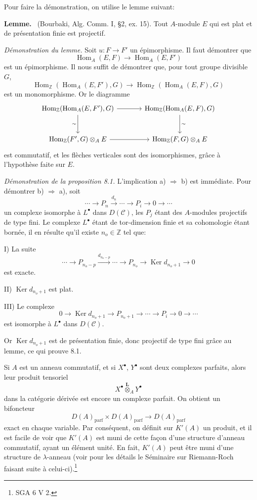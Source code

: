 \documentclass[11pt]{article}
\newenvironment{statement}[1]{\par\medskip\noindent\textbf{#1.}\ }{\par\medskip}
\DeclareMathOperator{\Hom}{Hom}
\providecommand{\Ker}{\operatorname{Ker}}
\providecommand{\parf}{\mathrm{parf}}
\providecommand{\Hom}{\operatorname{Hom}}
\providecommand{\cC}{\mathcal C}
\providecommand{\Ker}{\operatorname{Ker}}
\providecommand{\Ker}{\operatorname{Ker}}
\providecommand{\cC}{\mathcal C}
\providecommand{\parf}{\mathrm{parf}}
\begin{document}
Pour faire la démonstration, on utilise le lemme suivant:

\begin{statement}{Lemme}
(Bourbaki, Alg. Comm. I, §2, ex. 15). Tout $A$-module $E$ qui est plat et de présentation finie est projectif.
\end{statement}

\emph{Démonstration du lemme.} Soit $u:F\to F'$ un épimorphisme. Il faut démontrer que
\[
\Hom_A(E,F)\longrightarrow\Hom_A(E,F')
\]
est un épimorphisme. Il nous suffit de démontrer que, pour tout groupe divisible $G$,
\[
\Hom_{\mathbb Z}(\Hom_A(E,F'),G)\longrightarrow
\Hom_{\mathbb Z}(\Hom_A(E,F),G)
\]
est un monomorphisme. Or le diagramme
\[
\begin{tikzcd}[column sep=large,row sep=large]
\Hom_{\mathbb Z}(\Hom_A(E,F'),G)
 \arrow[r]\arrow[d,"\sim"']&
\Hom_{\mathbb Z}(\Hom_A(E,F),G)\arrow[d,"\sim"]\\
\Hom_{\mathbb Z}(F',G)\otimes_A E
 \arrow[r]&
\Hom_{\mathbb Z}(F,G)\otimes_A E
\end{tikzcd}
\]
est commutatif, et les flèches verticales sont des isomorphismes, grâce à l'hypothèse faite sur $E$.

\emph{Démonstration de la proposition 8.1.} L'implication a) $\Rightarrow$ b) est immédiate. Pour démontrer b) $\Rightarrow$ a), soit
\[
\cdots\longrightarrow P_n\xrightarrow{d_n}\cdots\longrightarrow P_i\longrightarrow 0\longrightarrow\cdots
\]
un complexe isomorphe à $L^\bullet$ dans $D(\cC)$, les $P_j$ étant des $A$-modules projectifs de type fini. Le complexe $L^\bullet$ étant de tor-dimension finie et sa cohomologie étant bornée, il en résulte qu'il existe $n_o\in\mathbb Z$ tel que:

I) La suite
\[
\cdots\longrightarrow P_{n_o-p}\xrightarrow{d_{n_o-p}}\cdots\longrightarrow
P_{n_o}\longrightarrow \Ker d_{n_o+1}\longrightarrow0
\]
est exacte.

II) $\Ker d_{n_o+1}$ est plat.

III) Le complexe
\[
0\longrightarrow \Ker d_{n_o+1}\longrightarrow P_{n_o+1}\longrightarrow\cdots\longrightarrow P_i\longrightarrow0\longrightarrow\cdots
\]
est isomorphe à $L^\bullet$ dans $D(\cC)$.

Or $\Ker d_{n_o+1}$ est de présentation finie, donc projectif de type fini grâce au lemme, ce qui prouve 8.1.

Si $A$ est un anneau commutatif, et si $X^\bullet$, $Y^\bullet$ sont deux complexes parfaits, alors leur produit tensoriel
\[
X^\bullet\overset{\mathbf L}{\otimes}_A Y^\bullet
\]
dans la catégorie dérivée est encore un complexe parfait. On obtient un bifoncteur
\[
D(A)_{\parf}\times D(A)_{\parf}\longrightarrow D(A)_{\parf}
\]
exact en chaque variable. Par conséquent, on définit sur $K'(A)$ un produit, et il est facile de voir que $K'(A)$ est muni de cette façon d'une structure d'anneau commutatif, ayant un élément unité. En fait, $K'(A)$ peut être muni d'une structure de $\lambda$-anneau (voir pour les détails le Séminaire sur Riemann-Roch faisant suite à celui-ci).\footnote{SGA 6 V 2.}
\end{document}
